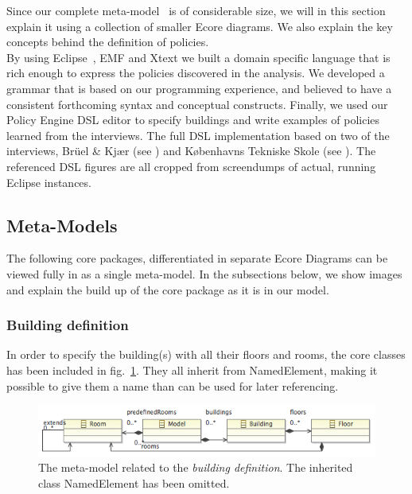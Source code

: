 Since our complete meta-model~\cite{ecore-complete} is of considerable size, we will in this section explain it using a collection of smaller Ecore diagrams. We also explain the key concepts behind the definition of policies.\\
 
By using Eclipse~\cite{eclipse}, EMF and Xtext we built a domain specific language that is rich enough to express the policies discovered in the analysis. We developed a grammar that is based on our programming experience, and believed to have a consistent forthcoming syntax and conceptual constructs. Finally, we used our Policy Engine DSL editor to specify buildings and write examples of policies learned from the interviews. The full DSL implementation based on two of the interviews,  Br\"{u}el \& Kj\ae r (see ) and  K\o benhavns Tekniske Skole (see ). The referenced DSL figures are all cropped from screendumps of actual, running Eclipse instances.

\subsection{Meta-Models}

The following core packages, differentiated in separate Ecore Diagrams can be viewed fully in  as a single meta-model. In the subsections below, we show images and explain the build up of the core package as it is in our model. 

\subsubsection{Building definition}
In order to specify the building(s) with all their floors and rooms, the core classes has been included in fig. \ref{fig:ecore-building-definition}. They all inherit from NamedElement, making it possible to give them a name than can be used for later referencing.
\begin{figure}[h]
  \centering \includegraphics[scale=.5]{ecore-building-definition.png}  
	\caption{The meta-model related to the \textit{building definition}. The inherited class NamedElement has been omitted.}
	\label{fig:ecore-building-definition}
\end{figure}

